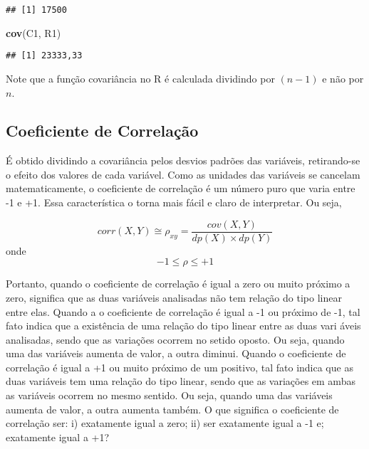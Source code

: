 \documentclass[
]{book}
\newenvironment{Shaded}{\begin{snugshade}}{\end{snugshade}}
\newcommand{\KeywordTok}[1]{\textcolor[rgb]{0.13,0.29,0.53}{\textbf{#1}}}
\newcommand{\NormalTok}[1]{#1}
\begin{document}
\begin{verbatim}
## [1] 17500
\end{verbatim}

\begin{Shaded}
\begin{Highlighting}[]
\KeywordTok{cov}\NormalTok{(C1, R1)}
\end{Highlighting}
\end{Shaded}

\begin{verbatim}
## [1] 23333,33
\end{verbatim}

Note que a função covariância no R é calculada dividindo por \((n-1)\) e não por \(n\).

\hypertarget{coeficiente-de-correlauxe7uxe3o}{%
\subsection{Coeficiente de Correlação}\label{coeficiente-de-correlauxe7uxe3o}}

É obtido dividindo a covariância pelos desvios padrões das variáveis, retirando-se o efeito dos valores de cada variável. Como as unidades das variáveis se cancelam matematicamente, o coeficiente de correlação é um número puro que varia entre -1 e +1. Essa característica o torna mais fácil e claro de interpretar. Ou seja,

\begin{equation*}
 corr(X,Y) \cong \rho_{xy} = \frac{cov(X,Y)}{dp(X) \times dp(Y)}
\end{equation*}
onde
\begin{equation*}
  -1 \leq \rho \leq +1
\end{equation*}

Portanto, quando o coeficiente de correlação é igual a zero ou muito próximo a zero, significa que as duas variáveis analisadas não tem relação do tipo linear entre elas. Quando a o coeficiente de correlação é igual a -1 ou próximo de -1, tal fato indica que a existência de uma relação do tipo linear entre as duas vari
áveis analisadas, sendo que as variações ocorrem no setido oposto. Ou seja, quando uma das variáveis aumenta de valor, a outra diminui. Quando o coeficiente de correlação é igual a +1 ou muito próximo de um positivo, tal fato indica que as duas variáveis tem uma relação do tipo linear, sendo que as variações em ambas as variáveis ocorrem no mesmo sentido. Ou seja, quando uma das variáveis aumenta de valor, a outra aumenta também. O que significa o coeficiente de correlação ser: i) exatamente igual a zero; ii) ser exatamente igual a -1 e; exatamente igual a +1?
\end{document}
